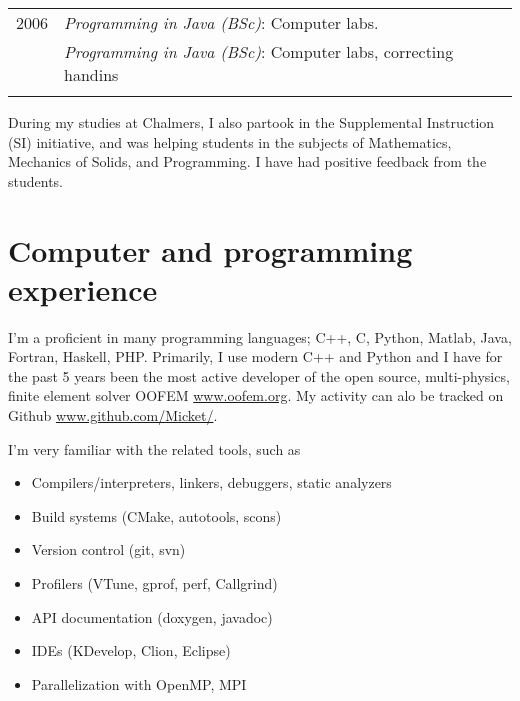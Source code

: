 \documentclass[a4paper,10pt]{article} %
\begin{document}
{\begin{tabular}{r|p{11cm}}

\textsc{2006} 
              & \emph{Programming in Java (BSc)}: \footnotesize{Computer labs.}\\
              & \emph{Programming in Java (BSc)}: \footnotesize{Computer labs, correcting handins}\\
\multicolumn{2}{c}{} \\

% 

\end{tabular}

During my studies at Chalmers, I also partook in the Supplemental Instruction (SI) initiative, and was helping students in the subjects of Mathematics, Mechanics of Solids, and Programming.
I have had positive feedback from the students.


\newpage
\section{Computer and programming experience}

I'm a proficient in many programming languages; C++, C, Python, Matlab, Java, Fortran, Haskell, PHP.
Primarily, I use modern C++ and Python and I have for the past 5 years been the most active developer of the open source, multi-physics, finite element solver OOFEM \url{www.oofem.org}. My activity can alo be tracked on Github \url{www.github.com/Micket/}.

I'm very familiar with the related tools, such as
\begin{itemize}
 \item Compilers/interpreters, linkers, debuggers, static analyzers
 \item Build systems (CMake, autotools, scons)
 \item Version control (git, svn)
 \item Profilers (VTune, gprof, perf, Callgrind)
 \item API documentation (doxygen, javadoc)
 \item IDEs (KDevelop, Clion, Eclipse)
 \item Parallelization with OpenMP, MPI
\end{itemize}

}
\end{document}
